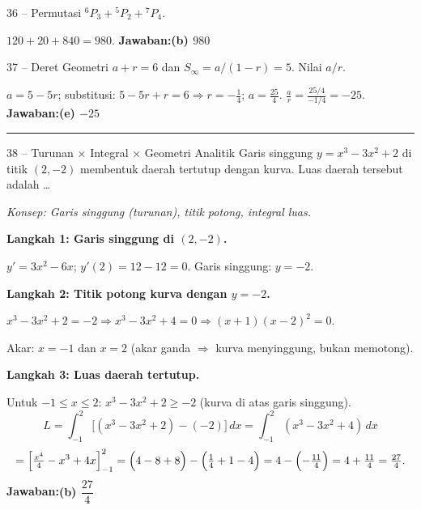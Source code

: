 \documentclass[11pt]{article}
\newcommand{\jawaban}[1]{\textbf{Jawaban:}\enspace\colorbox{gold!30}{\textbf{#1}}}
\newcommand{\konsep}[1]{\textit{Konsep: #1.}}
\begin{document}
\begin{soal}{36 -- Permutasi}
${}^6P_3+{}^5P_2+{}^7P_4$.
\end{soal}
\begin{pembox}
$120+20+840=980$.
\jawaban{(b) $980$}
\end{pembox}

\begin{soal}{37 -- Deret Geometri}
$a+r=6$ dan $S_\infty=a/(1-r)=5$. Nilai $a/r$.
\end{soal}
\begin{pembox}
$a=5-5r$; substitusi: $5-5r+r=6\Rightarrow r=-\tfrac14$; $a=\tfrac{25}{4}$. $\frac ar=\frac{25/4}{-1/4}=-25$.
\jawaban{(e) $-25$}
\end{pembox}

\smallskip\hrule\medskip

\begin{soal}{38 -- Turunan $\times$ Integral $\times$ Geometri Analitik}
Garis singgung $y=x^3-3x^2+2$ di titik $(2,-2)$ membentuk daerah tertutup dengan kurva.
Luas daerah tersebut adalah \ldots
\end{soal}
\begin{pembox}
\konsep{Garis singgung (turunan), titik potong, integral luas}

\textbf{Langkah 1: Garis singgung di $(2,-2)$.}

$y'=3x^2-6x$; $y'(2)=12-12=0$. Garis singgung: $y=-2$.

\textbf{Langkah 2: Titik potong kurva dengan $y=-2$.}

$x^3-3x^2+2=-2\Rightarrow x^3-3x^2+4=0\Rightarrow(x+1)(x-2)^2=0$.

Akar: $x=-1$ dan $x=2$ (akar ganda $\Rightarrow$ kurva menyinggung, bukan memotong).

\textbf{Langkah 3: Luas daerah tertutup.}

Untuk $-1\leq x\leq2$: $x^3-3x^2+2\geq-2$ (kurva di atas garis singgung).
\[
L=\int_{-1}^{2}\bigl[(x^3-3x^2+2)-(-2)\bigr]\,dx
=\int_{-1}^{2}(x^3-3x^2+4)\,dx
\]
\[
=\Bigl[\tfrac{x^4}{4}-x^3+4x\Bigr]_{-1}^{2}
=\Bigl(4-8+8\Bigr)-\Bigl(\tfrac{1}{4}+1-4\Bigr)
=4-\Bigl(-\tfrac{11}{4}\Bigr)=4+\tfrac{11}{4}=\tfrac{27}{4}.
\]
\jawaban{(b) $\dfrac{27}{4}$}
\end{pembox}
\end{document}
